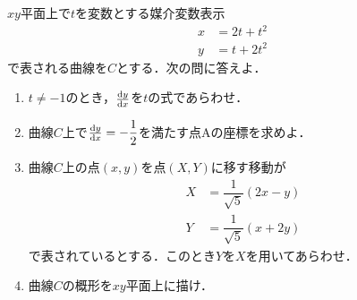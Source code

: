 \documentclass[../../main.tex]{subfiles}
\begin{document}
$xy$平面上で$t$を変数とする媒介変数表示
\begin{align}
  x & =2t+t^2 \\
  y & =t+2t^2
\end{align}
で表される曲線を$C$とする．次の問に答えよ．
\begin{enumerate}
  \item $t\neq -1$のとき，$\dv{y}{x}$を$t$の式であらわせ．
  \item 曲線$C$上で$\dv{y}{x}=-\dfrac{1}{2}$を満たす点$\mathrm{A}$の座標を求めよ．
  \item 曲線$C$上の点$(x,y)$を点$(X,Y)$に移す移動が
    \begin{align}
      X & =\dfrac{1}{\sqrt{5}}(2x-y) \\
      Y & =\dfrac{1}{\sqrt{5}}(x+2y)
    \end{align}
    で表されているとする．このとき$Y$を$X$を用いてあらわせ．
  \item 曲線$C$の概形を$xy$平面上に描け．
\end{enumerate}
\end{document}
